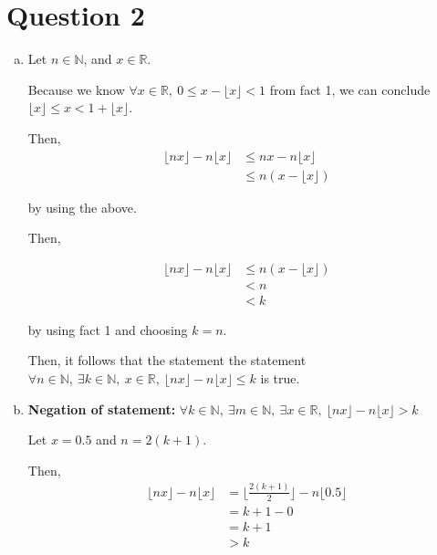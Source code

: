 \documentclass[12pt]{article}
\begin{document}
\section*{Question 2}

\begin{enumerate}[a.]
    \item

    Let $n \in \mathbb{N}$, and $x \in \mathbb{R}$.

    \bigskip

    Because we know $\forall x \in \mathbb{R},\: 0 \leq x - \lfloor x \rfloor < 1$ from
    fact 1, we can conclude $\lfloor x \rfloor \leq x < 1 + \lfloor x \rfloor$.

    \bigskip

    Then,
    \setcounter{equation}{0}
    \begin{align}
        \lfloor nx \rfloor - n \lfloor x \rfloor &\leq nx - n\lfloor x \rfloor\\
        &\leq n(x - \lfloor x \rfloor)
    \end{align}

    by using the above.

    \bigskip

    Then,

    \begin{align}
        \lfloor nx \rfloor - n \lfloor x \rfloor &\leq n(x - \lfloor x \rfloor)\\
        &< n\\
        &< k
    \end{align}

    by using fact 1 and choosing $k = n$.

    \bigskip

    Then, it follows that the statement the statement
    $\forall n \in \mathbb{N},\:\exists k \in \mathbb{N},\:x \in \mathbb{R},\:\lfloor
    nx \rfloor - n \lfloor x \rfloor \leq k$ is true.

    \item

    \textbf{Negation of statement:} $\forall k \in \mathbb{N},\: \exists m \in \mathbb{N},\:
    \exists x \in \mathbb{R},\: \lfloor nx \rfloor - n \lfloor x \rfloor > k$

    \bigskip

    Let $x = 0.5$ and $n = 2(k+1)$.

    \bigskip

    Then,
    \setcounter{equation}{0}
    \begin{align}
        \lfloor nx \rfloor - n \lfloor x \rfloor &= \lfloor \frac{2(k+1)}{2} \rfloor - n\lfloor 0.5 \rfloor\\
        &= k + 1 - 0\\
        &= k + 1\\
        &> k
    \end{align}


\end{enumerate}
\end{document}
